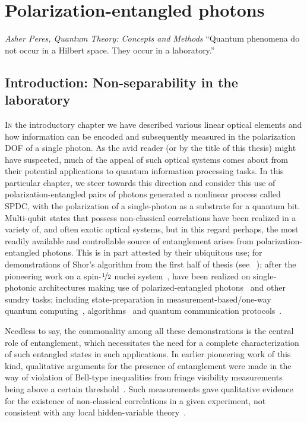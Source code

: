 \chapter{Polarization-entangled photons}

\begin{epigram}{\textit{Asher Peres, Quantum Theory: Concepts and Methods}}
    \enquote{Quantum phenomena do not occur in a Hilbert space. They occur in a laboratory.} 
\end{epigram}

\section{Introduction: Non-separability in the laboratory}

\lettrine[lines=3]{I}{n} the introductory chapter we have described various linear optical elements and how information can be encoded and subsequently measured in the polarization \acs{DOF} of a single photon. As the avid reader (or by the title of this thesis) might have suspected, much of the appeal of such optical systems comes about from their potential applications to quantum information processing tasks. In this particular chapter, we steer towards this direction and consider this use of polarization-entangled pairs of photons generated \via a nonlinear process called \acs{SPDC}, with the polarization of a single-photon as a substrate for a quantum bit. Multi-qubit states that possess non-classical correlations have been realized in a variety of, and often exotic optical systems, but in this regard perhaps, the most readily available and controllable source of entanglement arises from polarization-entangled photons. This is in part attested by their ubiquitous use; for demonstrations of Shor's algorithm from the first half of thesis (see ~); after the pioneering work on a spin-$\nicefrac{1}{2}$ nuclei system~\cite{Vandersypen_2001}, have been realized on single-photonic architectures making use of polarized-entangled photons~\cite{Lu_2007,Lanyon_2007,Lopez_2012} and other sundry tasks; including state-preparation in measurement-based/one-way quantum computing~\cite{Lu_2006, Kiesel_2005, Park_2007, Vallone_2008, Tokunaga_2008}, algorithms~\cite{Walther_2005, Prevedel_2007, Chen_2007} and quantum communication protocols~\cite{Kiesel_2007, Gaertner_2008, Schmid_2010, Bell_2014}. 

\bigskip
\noindent
Needless to say, the commonality among all these demonstrations is the central role of entanglement, which necessitates the need for a complete characterization of such entangled states in such applications. In earlier pioneering work of this kind, qualitative arguments for the presence of entanglement were made in the way of violation of Bell-type inequalities from fringe visibility measurements being above a certain threshold~\cite{Kwiat_1995, Kwiat_1999}. Such measurements gave qualitative evidence for the existence of non-classical correlations in a given experiment, not consistent with any local hidden-variable theory~\cite{Bell_1964,CHSH_1969,GHZ_2007}. 

